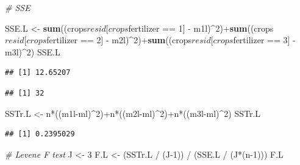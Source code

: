 \documentclass[]{book}
\newenvironment{Shaded}{\begin{snugshade}}{\end{snugshade}}
\newcommand{\KeywordTok}[1]{\textcolor[rgb]{0.13,0.29,0.53}{\textbf{{#1}}}}
\newcommand{\DecValTok}[1]{\textcolor[rgb]{0.00,0.00,0.81}{{#1}}}
\newcommand{\StringTok}[1]{\textcolor[rgb]{0.31,0.60,0.02}{{#1}}}
\newcommand{\CommentTok}[1]{\textcolor[rgb]{0.56,0.35,0.01}{\textit{{#1}}}}
\newcommand{\NormalTok}[1]{{#1}}
\begin{document}
\begin{Shaded}
\begin{Highlighting}[]
\CommentTok{# SSE}

\NormalTok{SSE.L <-}\StringTok{ }\KeywordTok{sum}\NormalTok{((crops$resid[crops$fertilizer ==}\StringTok{ }\DecValTok{1}\NormalTok{] -}\StringTok{ }\NormalTok{m1l)^}\DecValTok{2}\NormalTok{)+}\KeywordTok{sum}\NormalTok{((crops$resid[crops$fertilizer ==}\StringTok{ }\DecValTok{2}\NormalTok{] -}\StringTok{ }\NormalTok{m2l)^}\DecValTok{2}\NormalTok{)+}\KeywordTok{sum}\NormalTok{((crops$resid[crops$fertilizer ==}\StringTok{ }\DecValTok{3}\NormalTok{] -}\StringTok{ }\NormalTok{m3l)^}\DecValTok{2}\NormalTok{)}
\NormalTok{SSE.L}
\end{Highlighting}
\end{Shaded}

\begin{verbatim}
## [1] 12.65207
\end{verbatim}

\begin{Shaded}
\end{Shaded}

\begin{verbatim}
## [1] 32
\end{verbatim}

\begin{Shaded}
\begin{Highlighting}[]
\NormalTok{SSTr.L <-}\StringTok{ }\NormalTok{n*((m1l-ml)^}\DecValTok{2}\NormalTok{)+n*((m2l-ml)^}\DecValTok{2}\NormalTok{)+n*((m3l-ml)^}\DecValTok{2}\NormalTok{)}
\NormalTok{SSTr.L}
\end{Highlighting}
\end{Shaded}

\begin{verbatim}
## [1] 0.2395029
\end{verbatim}

\begin{Shaded}
\begin{Highlighting}[]
\CommentTok{# Levene F test}
\NormalTok{J <-}\StringTok{ }\DecValTok{3}
\NormalTok{F.L <-}\StringTok{ }\NormalTok{(SSTr.L /}\StringTok{ }\NormalTok{(J}\DecValTok{-1}\NormalTok{)) /}\StringTok{ }\NormalTok{(SSE.L /}\StringTok{ }\NormalTok{(J*(n}\DecValTok{-1}\NormalTok{)))}
\NormalTok{F.L}
\end{Highlighting}
\end{Shaded}
\end{document}
